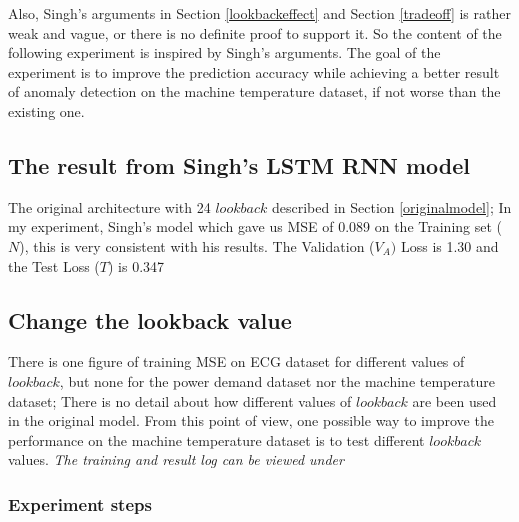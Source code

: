 \documentclass{article}
\begin{document}
Also, Singh's arguments in Section \ref{lookbackeffect} and Section
\ref{tradeoff} is rather weak and vague, or there is no definite proof to
support it. So the content of the following experiment is inspired by Singh's
arguments. The goal of the experiment is to improve the prediction accuracy
while achieving a better result of anomaly detection on the machine temperature
dataset, if not worse than the existing one. 

\subsection{The result from Singh's LSTM RNN model}
\label{originalmodelresult}
The original architecture with 24 $lookback$ described in Section
\ref{originalmodel}; In my experiment, Singh's model which gave us MSE of
0.089 on the Training set ($N$), this is very consistent with his results. The
Validation ($
V_A)$ Loss is 1.30 and the Test Loss ($T$) is 0.347

\subsection{Change the lookback value}

There is one figure of training MSE on ECG dataset for different values
of $lookback$, but none for the power demand dataset nor the machine
temperature dataset; There is no detail about how different values of
$lookback$ are been used in the original model. From this point of view, one
possible way to improve the performance on the machine temperature dataset is
to test different $lookback$ values.
\textit{The training and result log can be viewed under
 }

\subsubsection{Experiment steps}
\end{document}
